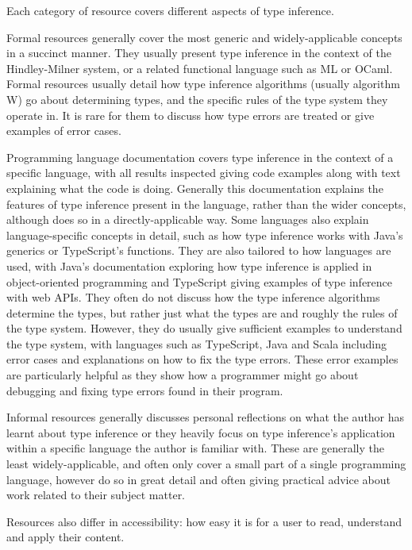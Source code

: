 \documentclass[a4paper,fleqn,12pt]{article}
\begin{document}
Each category of resource covers different aspects of type inference.

Formal resources generally cover the most generic and widely-applicable concepts in a succinct manner. They usually present type inference in the context of the Hindley-Milner system, or a related functional language such as ML or OCaml. Formal resources usually detail how type inference algorithms (usually algorithm W) go about determining types, and the specific rules of the type system they operate in. It is rare for them to discuss how type errors are treated or give examples of error cases.

Programming language documentation covers type inference in the context of a specific language, with all results inspected giving code examples along with text explaining what the code is doing. Generally this documentation explains the features of type inference present in the language, rather than the wider concepts, although does so in a directly-applicable way. Some languages also explain language-specific concepts in detail, such as how type inference works with Java’s generics or TypeScript’s functions. They are also tailored to how languages are used, with Java’s documentation exploring how type inference is applied in object-oriented programming and TypeScript giving examples of type inference with web APIs. They often do not discuss how the type inference algorithms determine the types, but rather just what the types are and roughly the rules of the type system. However, they do usually give sufficient examples to understand the type system, with languages such as TypeScript, Java and Scala including error cases and explanations on how to fix the type errors. These error examples are particularly helpful as they show how a programmer might go about debugging and fixing type errors found in their program.

Informal resources generally discusses personal reflections on what the author has learnt about type inference or they heavily focus on type inference’s application within a specific language the author is familiar with. These are generally the least widely-applicable, and often only cover a small part of a single programming language, however do so in great detail and often giving practical advice about work related to their subject matter.

Resources also differ in accessibility: how easy it is for a user to read, understand and apply their content.
\end{document}
